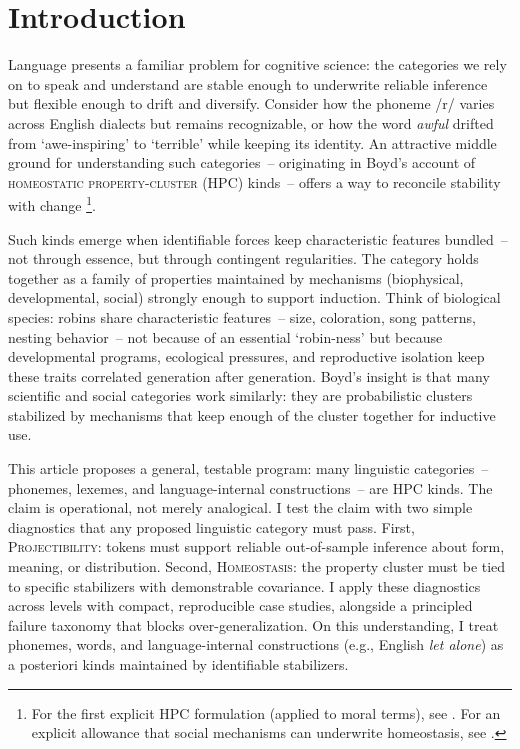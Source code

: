 \documentclass[12pt]{article}
\begin{document}
\section{Introduction}
Language presents a familiar problem for cognitive science: the categories we rely on to speak and understand are stable enough to underwrite reliable inference but flexible enough to drift and diversify. Consider how the phoneme /r/ varies across English dialects but remains recognizable, or how the word \textit{awful} drifted from `awe-inspiring' to `terrible' while keeping its identity. An attractive middle ground for understanding such categories~-- originating in Boyd's account of \textsc{homeostatic property-cluster} (HPC) kinds~-- offers a way to reconcile stability with change \citep{Boyd1991Enthusiasm,Boyd1999Homeostasis}\footnote{For the first explicit HPC formulation (applied to moral terms), see \citet[§3.8]{Boyd1988MoralRealist}. For an explicit allowance that social mechanisms can underwrite homeostasis, see \citet{Boyd2000Workmanship}.}.

Such kinds emerge when identifiable forces keep characteristic features bundled~-- not through essence, but through contingent regularities. The category holds together as a family of properties maintained by mechanisms (biophysical, developmental, social) strongly enough to support induction. Think of biological species: robins share characteristic features~-- size, coloration, song patterns, nesting behavior~-- not because of an essential `robin-ness' but because developmental programs, ecological pressures, and reproductive isolation keep these traits correlated generation after generation. Boyd's insight is that many scientific and social categories work similarly: they are probabilistic clusters stabilized by mechanisms that keep enough of the cluster together for inductive use. 

This article proposes a general, testable program: many linguistic categories~-- phonemes, lexemes, and language-internal constructions~-- are HPC kinds. The claim is operational, not merely analogical. I test the claim with two simple diagnostics that any proposed linguistic category must pass. First, \textsc{Projectibility}: tokens must support reliable out-of-sample inference about form, meaning, or distribution. Second, \textsc{Homeostasis}: the property cluster must be tied to specific stabilizers with demonstrable covariance. I apply these diagnostics across levels with compact, reproducible case studies, alongside a principled failure taxonomy that blocks over-generalization. On this understanding, I treat phonemes, words, and language-internal constructions (e.g., English \textit{let alone}) as a posteriori kinds maintained by identifiable stabilizers.
\end{document}
